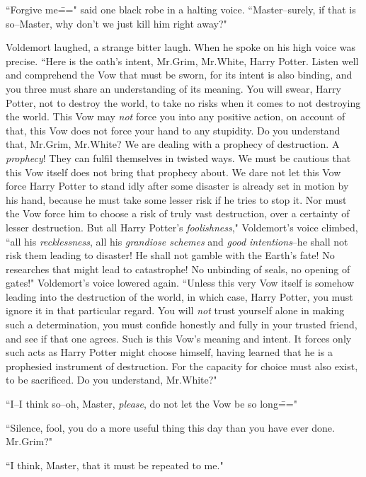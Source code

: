 ``Forgive me\===" said one black robe in a halting voice. ``Master\---surely, if that is so\---Master, why don't we just kill him right away?"

Voldemort laughed, a strange bitter laugh. When he spoke on his high voice was precise. ``Here is the oath's intent, Mr.\?Grim, Mr.\?White, Harry Potter. Listen well and comprehend the Vow that must be sworn, for its intent is also binding, and you three must share an understanding of its meaning. You will swear, Harry Potter, not to destroy the world, to take no risks when it comes to not destroying the world. This Vow may \emph{not} force you into any positive action, on account of that, this Vow does not force your hand to any stupidity. Do you understand that, Mr.\?Grim, Mr.\?White? We are dealing with a prophecy of destruction. A \emph{prophecy}! They can fulfil themselves in twisted ways. We must be cautious that this Vow itself does not bring that prophecy about. We dare not let this Vow force Harry Potter to stand idly after some disaster is already set in motion by his hand, because he must take some lesser risk if he tries to stop it. Nor must the Vow force him to choose a risk of truly vast destruction, over a certainty of lesser destruction. But all Harry Potter's \emph{foolishness}," Voldemort's voice climbed, ``all his \emph{recklessness}, all his \emph{grandiose schemes} and \emph{good intentions}\---he shall not risk them leading to disaster! He shall not gamble with the Earth's fate! No researches that might lead to catastrophe! No unbinding of seals, no opening of gates!" Voldemort's voice lowered again. ``Unless this very Vow itself is somehow leading into the destruction of the world, in which case, Harry Potter, you must ignore it in that particular regard. You will \emph{not} trust yourself alone in making such a determination, you must confide honestly and fully in your trusted friend, and see if that one agrees. Such is this Vow's meaning and intent. It forces only such acts as Harry Potter might choose himself, having learned that he is a prophesied instrument of destruction. For the capacity for choice must also exist, to be sacrificed. Do you understand, Mr.\?White?"

``I\---I think so\---oh, Master, \emph{please}, do not let the Vow be so long\==="

``Silence, fool, you do a more useful thing this day than you have ever done. Mr.\?Grim?"

``I think, Master, that it must be repeated to me."

